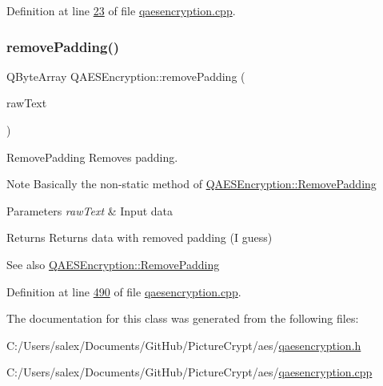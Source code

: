 Definition at line \mbox{\hyperlink{qaesencryption_8cpp_source_l00023}{23}} of file \mbox{\hyperlink{qaesencryption_8cpp_source}{qaesencryption.\+cpp}}.

\mbox{\label{class_q_a_e_s_encryption_a4dc7e77485e5a3e63eebc99b9386c17b}} 
\subsubsection{\texorpdfstring{remove\+Padding()}{removePadding()}}
{\footnotesize\ttfamily Q\+Byte\+Array Q\+A\+E\+S\+Encryption\+::remove\+Padding (\begin{DoxyParamCaption}\item[{const Q\+Byte\+Array \&}]{raw\+Text }\end{DoxyParamCaption})}



Remove\+Padding Removes padding. 

\begin{DoxyNote}{Note}
Basically the non-\/static method of \mbox{\hyperlink{class_q_a_e_s_encryption_abb2887bf5623a74053dd19627f3d3055}{Q\+A\+E\+S\+Encryption\+::\+Remove\+Padding}}
\end{DoxyNote}

\begin{DoxyParams}{Parameters}
{\em raw\+Text} & Input data \\
\hline
\end{DoxyParams}
\begin{DoxyReturn}{Returns}
Returns data with removed padding (I guess) 
\end{DoxyReturn}
\begin{DoxySeeAlso}{See also}
\mbox{\hyperlink{class_q_a_e_s_encryption_abb2887bf5623a74053dd19627f3d3055}{Q\+A\+E\+S\+Encryption\+::\+Remove\+Padding}} 
\end{DoxySeeAlso}


Definition at line \mbox{\hyperlink{qaesencryption_8cpp_source_l00490}{490}} of file \mbox{\hyperlink{qaesencryption_8cpp_source}{qaesencryption.\+cpp}}.



The documentation for this class was generated from the following files\+:\begin{DoxyCompactItemize}
\item 
C\+:/\+Users/salex/\+Documents/\+Git\+Hub/\+Picture\+Crypt/aes/\mbox{\hyperlink{qaesencryption_8h}{qaesencryption.\+h}}\item 
C\+:/\+Users/salex/\+Documents/\+Git\+Hub/\+Picture\+Crypt/aes/\mbox{\hyperlink{qaesencryption_8cpp}{qaesencryption.\+cpp}}\end{DoxyCompactItemize}
